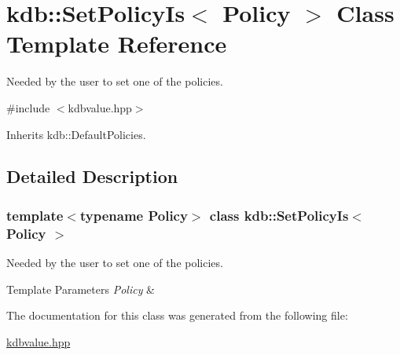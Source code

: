 \hypertarget{classkdb_1_1SetPolicyIs}{}\section{kdb\+::Set\+Policy\+Is$<$ Policy $>$ Class Template Reference}
\label{classkdb_1_1SetPolicyIs}


Needed by the user to set one of the policies.  




{\ttfamily \#include $<$kdbvalue.\+hpp$>$}



Inherits kdb\+::\+Default\+Policies.



\subsection{Detailed Description}
\subsubsection*{template$<$typename Policy$>$\newline
class kdb\+::\+Set\+Policy\+Is$<$ Policy $>$}

Needed by the user to set one of the policies. 


\begin{DoxyTemplParams}{Template Parameters}
{\em Policy} & \\
\hline
\end{DoxyTemplParams}


The documentation for this class was generated from the following file\+:\begin{DoxyCompactItemize}
\item 
\mbox{\hyperlink{kdbvalue_8hpp}{kdbvalue.\+hpp}}\end{DoxyCompactItemize}
